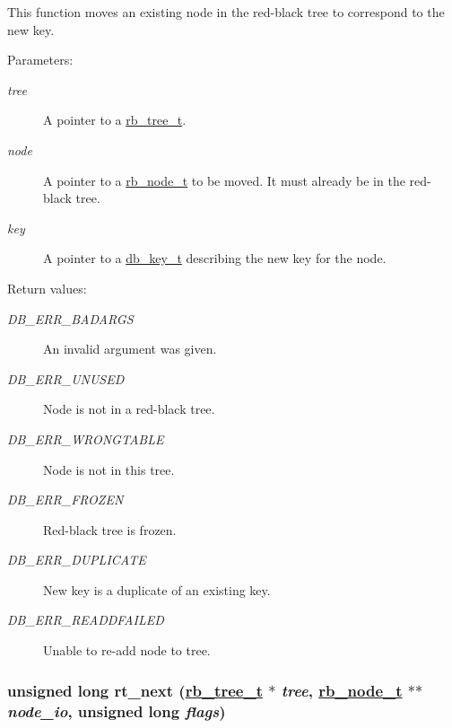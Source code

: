 This function moves an existing node in the red-black tree to correspond to the new key.\begin{Desc}
\item[Parameters: ]\par
\begin{description}
\item[{\em 
tree}]A pointer to a \hyperlink{group__dbprim__rbtree_a0}{rb\_\-tree\_\-t}. \item[{\em 
node}]A pointer to a \hyperlink{group__dbprim__rbtree_a1}{rb\_\-node\_\-t} to be moved. It must already be in the red-black tree. \item[{\em 
key}]A pointer to a \hyperlink{group__dbprim_a0}{db\_\-key\_\-t} describing the new key for the node.\end{description}
\end{Desc}
\begin{Desc}
\item[Return values: ]\par
\begin{description}
\item[{\em 
DB\_\-ERR\_\-BADARGS}]An invalid argument was given. \item[{\em 
DB\_\-ERR\_\-UNUSED}]Node is not in a red-black tree. \item[{\em 
DB\_\-ERR\_\-WRONGTABLE}]Node is not in this tree. \item[{\em 
DB\_\-ERR\_\-FROZEN}]Red-black tree is frozen. \item[{\em 
DB\_\-ERR\_\-DUPLICATE}]New key is a duplicate of an existing key. \item[{\em 
DB\_\-ERR\_\-READDFAILED}]Unable to re-add node to tree. \end{description}
\end{Desc}
\hypertarget{group__dbprim__rbtree_a10}{
\subsubsection[rt\_\-next]{\setlength{\rightskip}{0pt plus 5cm}unsigned long rt\_\-next (\hyperlink{group__dbprim__rbtree_a0}{rb\_\-tree\_\-t} $\ast$ {\em tree}, \hyperlink{group__dbprim__rbtree_a1}{rb\_\-node\_\-t} $\ast$$\ast$ {\em node\_\-io}, unsigned long {\em flags})}}
\label{group__dbprim__rbtree_a10}


